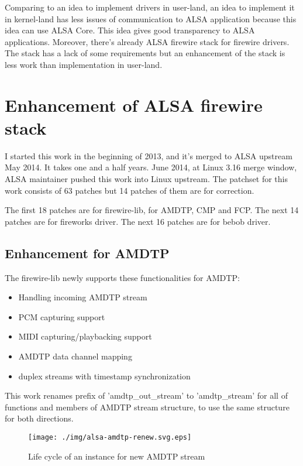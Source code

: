 \documentclass[onecolumn]{article}
\begin{document}
Comparing to an idea to implement drivers in user-land, an idea to implement it in kernel-land has less issues of communication to ALSA application because this idea can use ALSA Core. This idea gives good transparency to ALSA applications. Moreover, there's already ALSA firewire stack for firewire drivers. The stack has a lack of some requirements but an enhancement of the stack is less work than implementation in user-land.


\section{Enhancement of ALSA firewire stack}

I started this work in the beginning of 2013, and it's merged to ALSA upstream May 2014. It takes one and a half years. June 2014, at Linux 3.16 merge window, ALSA maintainer pushed this work into Linux upstream. The patchset for this work consists of 63 patches but 14 patches of them are for correction.

The first 18 patches are for firewire-lib, for AMDTP, CMP and FCP. The next 14 patches are for fireworks driver. The next 16 patches are for bebob driver.

\subsection{Enhancement for AMDTP}

The firewire-lib newly supports these functionalities for AMDTP:

\begin{itemize}
	\item Handling incoming AMDTP stream
	\item PCM capturing support
	\item MIDI capturing/playbacking support
	\item AMDTP data channel mapping
	\item duplex streams with timestamp synchronization
\end{itemize}

This work renames prefix of 'amdtp\_out\_stream' to 'amdtp\_stream' for all of functions and members of AMDTP stream structure, to use the same structure for both directions.

\begin{figure}[htbp]
	\centering
	\texttt{[image: ./img/alsa-amdtp-renew.svg.eps]}
	\caption{{Life cycle of an instance for new AMDTP stream}}
	\label{{lifecycle-new-amdtp-stream}}
\end{figure}
\end{document}
